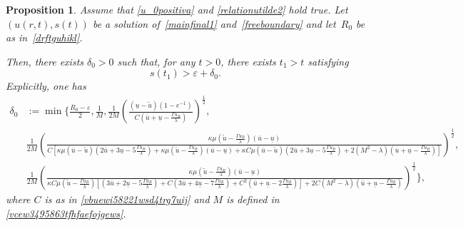 \documentclass[12pt,a4paper,intlimits,sumlimits]{amsart}
\theoremstyle{definition}
\theoremstyle{plain}
\newtheorem{proposition}[definition]{Proposition}
\numberwithin{equation}{section}
\begin{document}
\begin{proposition}\label{propstep1}
Assume that \eqref{u_0positiva} and \eqref{relationutilde2} hold true. Let $(u(r, t),s(t))$ be a solution of~\eqref{mainfinal1} and~\eqref{freeboundary} and let~$R_0$
be as in~\eqref{drftguhikl}.

Then, there exists $\delta_0>0$ such that, for any $t>0$, there exists $t_1>t$ satisfying
\begin{equation}\label{step1}
s(t_1)>\varepsilon+\delta_0.
\end{equation}
Explicitly, one has
\begin{equation}\label{delta0esplicita}
\begin{aligned}
\delta_0&:=\min\Bigg\{ \frac{R_0-\varepsilon}{2},\frac{1}{M},
{
\frac{1}{2M}\left(\frac{(\underline u-\widetilde u)(1-e^{-1})}{C\left(\overline u+\underline u -\frac{\Gamma u_B}{\lambda}\right)}\right)^\frac{1}{2},} \\
&\frac{1}{2M}{\scriptstyle \left(\frac{\kappa\mu\left(\widetilde u-\frac{\Gamma u_B}{\lambda}\right)(\overline{u}-\underline{u})}{C\left[\kappa\mu(\overline u-\widetilde u)\left(2\overline u+3\underline u-5\frac{\Gamma u_B}{\lambda} \right)
+\kappa\mu\left(\widetilde u-\frac{\Gamma u_B}{\lambda}\right)(\overline{u}-\underline{u})
+\kappa C\mu(\overline u-\widetilde u)\left(2\overline u+3\underline u-5\frac{\Gamma u_B}{\lambda} \right)+2(M^2-\lambda)\left(\overline u+\underline u -\frac{\Gamma u_B}{\lambda}\right)
\right]}\right)^\frac{1}{2}}, \\
&\frac{1}{2M}{\scriptstyle \left(\frac{\kappa\mu\left(\widetilde u-\frac{\Gamma u_B}{\lambda}\right)(\overline{u}-\underline{u})}{\kappa C\mu\left(\widetilde u-\frac{\Gamma u_B}{\lambda}\right)\left[\left(3\overline u+2\underline u-5\frac{\Gamma u_B}{\lambda}\right) 
+ C\left(3\overline u+4\underline u-7\frac{\Gamma u_B}{\lambda} \right)+ C^2\left(\overline u+\underline u-2\frac{\Gamma u_B}{\lambda} \right)\right]+2C(M^2-\lambda)\left(\overline u+\underline u-\frac{\Gamma u_B}{\lambda} \right)}\right)^\frac{1}{2}}
\Bigg\},
\end{aligned}
\end{equation}
where $C$ is as in \eqref{vbuewi58221wsd4trg7uij} and $M$ is defined in \eqref{vcew3495863tfhfaefojgews}.
\end{proposition}
\end{document}
